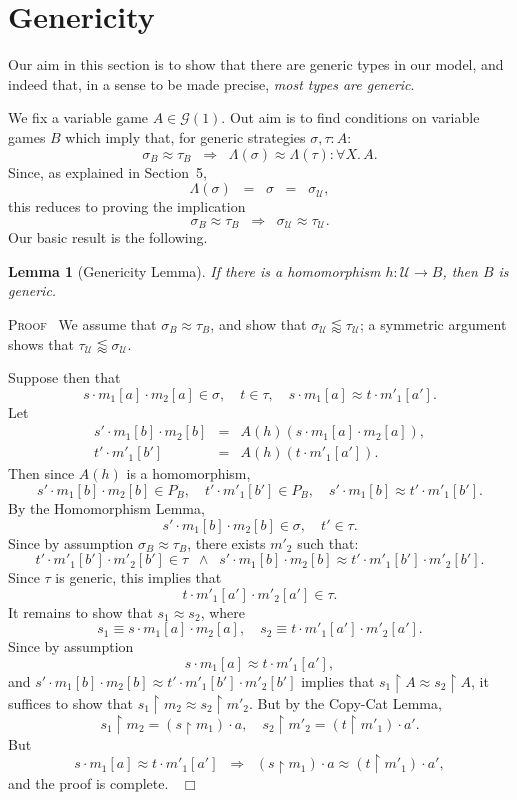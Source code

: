 \documentclass[a4paper,11pt]{article}
\newcommand{\gequiv}{\approx}
\newcommand{\UU}{\mathcal{U}}
\newtheorem{lemma}[proposition]{Lemma}
\newcommand{\GG}[1]{\mathcal{G}(#1)}
\newcommand{\restrict}{{\upharpoonright}}
\newcommand{\preord}{\lessapprox}
\newenvironment{proof}{\textsc{Proof}\ }{$\;\; \Box$}
\begin{document}
\section{Genericity}

Our aim in this section is to show that there are generic types in our
model, and indeed that, in a sense to be made precise, \emph{most
  types are generic}.

We fix a variable game $A \in \GG{1}$. Out aim is to find conditions
on variable games $B$ which imply that, for generic strategies $\sigma
, \tau : A$:
\[ \sigma_{B} \gequiv \tau_{B} \;\; \Longrightarrow \;\; \Lambda
(\sigma ) \gequiv \Lambda (\tau ) : \forall X. \, A . \] Since, as
explained in Section~5,
\[ \Lambda (\sigma ) \;\; = \;\; \sigma \;\; = \;\; \sigma_{\UU} , \]
this reduces to proving the implication
\[ \sigma_{B} \gequiv \tau_{B} \;\; \Longrightarrow \;\;
\sigma_{\UU} \gequiv \tau_{\UU} . \]
Our basic result is the following.

\begin{lemma}[Genericity Lemma]
\label{infgenericity}
If there is a homomorphism $h : \UU \longrightarrow B$, then $B$ is
generic.
\end{lemma}
\begin{proof}
We assume that $\sigma_{B} \gequiv \tau_{B}$, and show that
$\sigma_{\UU} \preord \tau_{\UU}$; a symmetric argument shows that $\tau_{\UU} \preord
\sigma_{\UU}$.

\noindent Suppose then that
\[ s \cdot m_{1}[a] \cdot m_{2}[a] \in \sigma , \quad t \in \tau ,
\quad s \cdot m_{1}[a] \gequiv t \cdot m'_{1}[a'] . \]
Let
\[ \begin{array}{lcl}
s' \cdot m_{1}[b] \cdot m_{2}[b] & = & A(h)(s \cdot m_{1}[a] \cdot
m_{2}[a]), \\
 t' \cdot
m'_{1}[b'] & = & A(h)(t \cdot m'_{1}[a']) .
\end{array} \]
Then since $A(h)$ is a homomorphism,
\[ s' \cdot m_{1}[b] \cdot m_{2}[b] \in P_{B} , \quad  t' \cdot
m'_{1}[b'] \in P_{B} , \quad s' \cdot
m_{1}[b]  \gequiv t' \cdot m'_{1}[b'] . \]
By the Homomorphism Lemma,
\[ s' \cdot m_{1}[b] \cdot m_{2}[b] \in \sigma , \quad t' \in \tau
. \]
Since by assumption $\sigma_{B} \gequiv \tau_{B}$, there exists
$m'_2$ such that:
\[ t' \cdot m'_{1}[b'] \cdot m'_{2}[b'] \in \tau \;\; \wedge \;\; s'
\cdot m_{1}[b] \cdot m_{2}[b] \gequiv t' \cdot m'_{1}[b'] \cdot
m'_{2}[b'] . \]
Since $\tau$ is generic, this implies that
\[ t \cdot m'_{1}[a'] \cdot m'_{2}[a'] \in \tau . \]
It remains to show that $s_1 \gequiv s_2$, where
\[ s_1 \equiv s \cdot m_{1}[a] \cdot m_{2}[a] , \quad s_2 \equiv t
\cdot m'_{1}[a'] \cdot m'_{2}[a'] . \]
Since by assumption
\[ s \cdot m_{1}[a] \gequiv t \cdot m'_{1}[a'] , \]
and $s'
\cdot m_{1}[b] \cdot m_{2}[b]  \gequiv t' \cdot m'_{1}[b'] \cdot
m'_{2}[b']$ implies that $s_1 \restrict A \gequiv s_2 \restrict A$,
it suffices to show that $s_1 \restrict m_2 \gequiv s_2 \restrict
m'_2$.
But by the Copy-Cat Lemma,
\[ s_1 \restrict m_2 = (s \restrict m_1 ) \cdot a , \quad s_2
\restrict m'_2 = (t \restrict m'_1 ) \cdot a' . \]
But
\[ s \cdot m_{1}[a] \gequiv t \cdot m'_{1}[a']  \;\; \Longrightarrow \;\; (s \restrict m_1 ) \cdot a \gequiv (t \restrict m'_1 ) \cdot a' , \]
and the proof is complete.
\end{proof}
\end{document}
